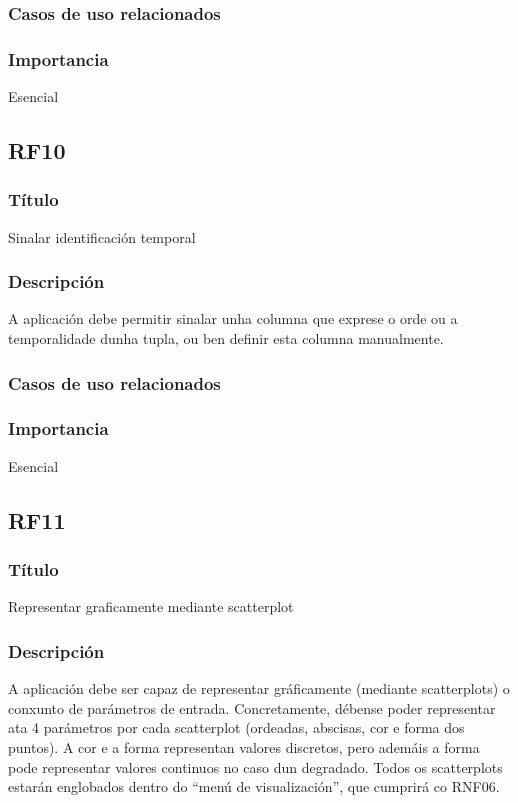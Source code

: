 \subsubsection{Casos de uso relacionados}
\subsubsection{Importancia}
Esencial

\subsection*{RF10}
\subsubsection{Título}
Sinalar identificación temporal
\subsubsection{Descripción}
A aplicación debe permitir sinalar unha columna que exprese o orde ou a temporalidade dunha tupla, ou ben definir esta columna manualmente.
\subsubsection{Casos de uso relacionados}
\subsubsection{Importancia}
Esencial

\subsection*{RF11}
\subsubsection{Título}
Representar graficamente mediante scatterplot
\subsubsection{Descripción}
A aplicación debe ser capaz de representar gráficamente (mediante scatterplots) o conxunto de parámetros de entrada. Concretamente, débense poder representar ata 4 parámetros por cada scatterplot (ordeadas, abscisas, cor e forma dos puntos). A cor e a forma representan valores discretos, pero ademáis a forma pode representar valores continuos no caso dun degradado. Todos os scatterplots estarán englobados dentro do ``menú de visualización'', que cumprirá co RNF06.
